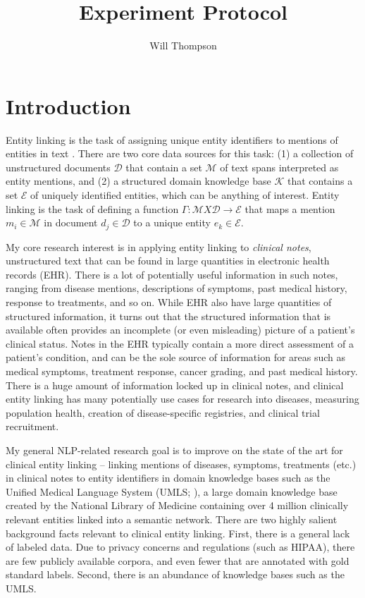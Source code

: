 \documentclass{article}
\title{Experiment Protocol}
\author{Will Thompson}
\begin{document}
\maketitle

\section{Introduction}

Entity linking is the task of assigning unique entity identifiers to mentions of entities in text \cite{sevgili_neural_2022}. There are two core data sources for this task: (1) a collection of unstructured documents $\mathscr{D}$ that contain a set $\mathscr{M}$ of text spans interpreted as entity mentions, and (2) a structured domain knowledge base $\mathscr{K}$ that contains a set $\mathscr{E}$ of uniquely identified entities, which can be anything of interest. Entity linking is the task of defining a function $\Gamma: \mathscr{M}X\mathscr{D} \rightarrow \mathscr{E}$ that maps a mention $m_{i} \in \mathscr{M}$ in document $d_{j} \in \mathscr{D}$ to a unique entity $e_{k} \in \mathscr{E}$.

My core research interest is in applying entity linking to \emph{clinical notes}, unstructured text that can be found in large quantities in electronic health records (EHR). There is a lot of potentially useful information in such notes, ranging from disease mentions, descriptions of symptoms, past medical history, response to treatments, and so on. While EHR also have large quantities of structured information, it turns out that the structured information that is available often provides an incomplete (or even  misleading) picture of a patient's clinical status. Notes in the EHR typically contain a more direct assessment of a patient's condition, and can be the sole source of information for areas such as medical symptoms, treatment response, cancer grading, and past medical history. There is a huge amount of information locked up in clinical notes, and clinical entity linking has many potentially use cases for research into diseases, measuring population health, creation of disease-specific registries, and clinical trial recruitment.

My general NLP-related research goal is to improve on the state of the art for clinical entity linking -- linking mentions of diseases, symptoms, treatments (etc.) in clinical notes to entity identifiers in domain knowledge bases such as the Unified Medical Language System (UMLS; \cite{bodenreider_unified_2004}), a large domain knowledge base created by the National Library of Medicine containing over 4 million clinically relevant entities linked into a semantic network. There are two highly salient background facts relevant to clinical entity linking. First, there is a general lack of labeled data. Due to privacy concerns and regulations (such as HIPAA), there are few publicly available corpora, and even fewer that are annotated with gold standard labels. Second, there is an abundance of knowledge bases such as the UMLS.
\end{document}
